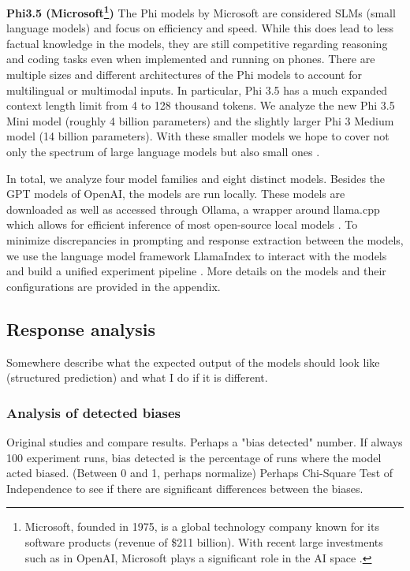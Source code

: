 \par \textbf{Phi3.5 (Microsoft\footnote{Microsoft, founded in 1975, is a global technology company known for its software products (revenue of \$211 billion). With recent large investments such as in OpenAI, Microsoft plays a significant role in the AI space \parencite{microsoft2024about}.})} The Phi models by Microsoft are considered SLMs (small language models) and focus on efficiency and speed. While this does lead to less factual knowledge in the models, they are still competitive regarding reasoning and coding tasks even when implemented and running on phones. There are multiple sizes and different architectures of the Phi models to account for multilingual or multimodal inputs. In particular, Phi 3.5 has a much expanded context length limit from 4 to 128 thousand tokens. We analyze the new Phi 3.5 Mini model (roughly 4 billion parameters) and the slightly larger Phi 3 Medium model (14 billion parameters). With these smaller models we hope to cover not only the spectrum of large language models but also small ones \parencite{abdin2024phi}.

\setlength{\parindent}{0pt}
\par In total, we analyze four model families and eight distinct models. Besides the GPT models of OpenAI, the models are run locally. These models are downloaded as well as accessed through Ollama, a wrapper around llama.cpp which allows for efficient inference of most open-source local models \parencite{gerganov2023llamacpp}. To minimize discrepancies in prompting and response extraction between the models, we use the language model framework LlamaIndex to interact with the models and build a unified experiment pipeline \parencite{liullamaindex2022}. More details on the models and their configurations are provided in the appendix.


\subsection{Response analysis}
Somewhere describe what the expected output of the models should look like (structured prediction) and what I do if it is different.

\subsubsection{Analysis of detected biases}
Original studies and compare results. Perhaps a "bias detected" number. If always 100 experiment runs, bias detected is the percentage of runs where the model acted biased. (Between 0 and 1, perhaps normalize)
Perhaps Chi-Square Test of Independence to see if there are significant differences between the biases.

